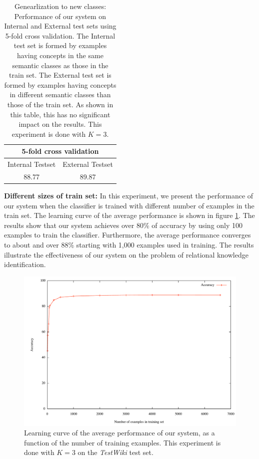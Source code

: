 {\begin{table}[h]
\begin{center}
\begin{tabular}{|c|c|}
\hline
\multicolumn{2}{|c|}{5-fold cross validation} \\
\hline
\hline
Internal Testset & External Testset \\
\hline
88.77 & 89.87 \\
\hline
\end{tabular}
\end{center}
\caption{Genearlization to new classes: Performance of our system on Internal and External test sets using
  5-fold cross validation. The Internal test set is formed by examples having concepts in the same semantic classes as
  those in the train set. The External test set is formed by
  examples having concepts in different semantic classes than those of the train set.
  As shown in this table, this has no significant impact on the results. This experiment is done with $K=3$.}
\label{tab:exp-inter-exter}
\end{table}

\vspace*{2 mm}

{\bf Different sizes of train set:} In this experiment, we present the
performance of our system when the classifier is trained with
different number of examples in the train set. The learning curve of
the average performance is shown in figure
\ref{fig:diff-train-size}. The results show that our system achieves
over 80\% of accuracy by using only 100 examples to train the
classifier. Furthermore, the average performance converges to about
and over 88\% starting with 1,000 examples used in training. The
results illustrate the effectiveness of our system on the problem of
relational knowledge identification.

\begin{figure}[htp]
\centering
\includegraphics[totalheight=0.25\textheight]{DiffTrainSizes}
\caption{Learning curve of the average performance of our system, as a
  function of the number of training examples. This experiment is done
  with $K=3$ on the {\em TestWiki} test set.}
\label{fig:diff-train-size}
\end{figure}
}

